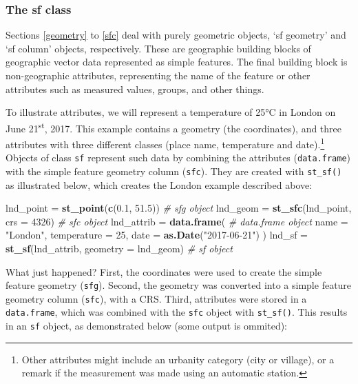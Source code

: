 \documentclass[]{krantz}
\newenvironment{Shaded}{\begin{snugshade}}{\end{snugshade}}
\newcommand{\CommentTok}[1]{\textcolor[rgb]{0.37,0.37,0.37}{\textit{#1}}}
\newcommand{\DataTypeTok}[1]{\textcolor[rgb]{0.27,0.27,0.27}{#1}}
\newcommand{\DecValTok}[1]{\textcolor[rgb]{0.06,0.06,0.06}{#1}}
\newcommand{\FloatTok}[1]{\textcolor[rgb]{0.06,0.06,0.06}{#1}}
\newcommand{\KeywordTok}[1]{\textcolor[rgb]{0.27,0.27,0.27}{\textbf{#1}}}
\newcommand{\NormalTok}[1]{#1}
\newcommand{\StringTok}[1]{\textcolor[rgb]{0.5,0.5,0.5}{#1}}
\let\rmarkdownfootnote\footnote%
\def\footnote{\protect\rmarkdownfootnote}
\begin{document}
\hypertarget{sf}{%
\subsubsection{The sf class}\label{sf}}

Sections \ref{geometry} to \ref{sfc} deal with purely geometric objects, `sf geometry' and `sf column' objects, respectively.
These are geographic building blocks of geographic vector data represented as simple features.
The final building block is non-geographic attributes, representing the name of the feature or other attributes such as measured values, groups, and other things.

To illustrate attributes, we will represent a temperature of 25°C in London on June 21\textsuperscript{st}, 2017.
This example contains a geometry (the coordinates), and three attributes with three different classes (place name, temperature and date).\footnote{Other attributes might include an urbanity category (city or village), or a remark if the measurement was made using an automatic station.}
Objects of class \texttt{sf} represent such data by combining the attributes (\texttt{data.frame}) with the simple feature geometry column (\texttt{sfc}).
They are created with \texttt{st\_sf()} as illustrated below, which creates the London example described above:

\begin{Shaded}
\begin{Highlighting}[]
\NormalTok{lnd_point =}\StringTok{ }\KeywordTok{st_point}\NormalTok{(}\KeywordTok{c}\NormalTok{(}\FloatTok{0.1}\NormalTok{, }\FloatTok{51.5}\NormalTok{))                 }\CommentTok{# sfg object}
\NormalTok{lnd_geom =}\StringTok{ }\KeywordTok{st_sfc}\NormalTok{(lnd_point, }\DataTypeTok{crs =} \DecValTok{4326}\NormalTok{)           }\CommentTok{# sfc object}
\NormalTok{lnd_attrib =}\StringTok{ }\KeywordTok{data.frame}\NormalTok{(                           }\CommentTok{# data.frame object}
  \DataTypeTok{name =} \StringTok{"London"}\NormalTok{,}
  \DataTypeTok{temperature =} \DecValTok{25}\NormalTok{,}
  \DataTypeTok{date =} \KeywordTok{as.Date}\NormalTok{(}\StringTok{"2017-06-21"}\NormalTok{)}
\NormalTok{  )}
\NormalTok{lnd_sf =}\StringTok{ }\KeywordTok{st_sf}\NormalTok{(lnd_attrib, }\DataTypeTok{geometry =}\NormalTok{ lnd_geom)    }\CommentTok{# sf object}
\end{Highlighting}
\end{Shaded}

What just happened? First, the coordinates were used to create the simple feature geometry (\texttt{sfg}).
Second, the geometry was converted into a simple feature geometry column (\texttt{sfc}), with a CRS.
Third, attributes were stored in a \texttt{data.frame}, which was combined with the \texttt{sfc} object with \texttt{st\_sf()}.
This results in an \texttt{sf} object, as demonstrated below (some output is ommited):
\end{document}
